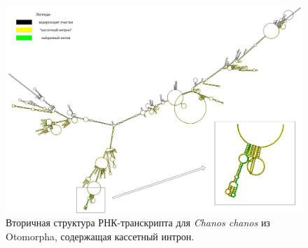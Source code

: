 \newpage
\begin{figure}[h] %
    \centering
    \includegraphics[width=1.0\textwidth]{images/Chanos_chanos_2nd_structure}
    \caption{Вторичная структура РНК-транскрипта для \textit{Chanos chanos} из Otomorpha, содержащая кассетный интрон.}
    \label{fig:Chanos_chanos_2nd_structure}
\end{figure}
